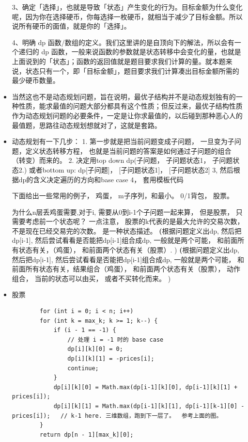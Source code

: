 \documentclass[a4paper,11pt,twoside]{book}
\begin{document}
\begin{itemize}
	3、确定「选择」，也就是导致「状态」产生变化的行为。目标金额为什么变化呢，因为你在选择硬币，你每选择一枚硬币，就相当于减少了目标金额。所以说所有硬币的面值，就是你的「选择」。
	
	4、明确 dp 函数/数组的定义。我们这里讲的是自顶向下的解法，所以会有一个递归的 dp 函数，一般来说函数的参数就是状态转移中会变化的量，也就是上面说到的「状态」；函数的返回值就是题目要求我们计算的量。就本题来说，状态只有一个，即「目标金额」，题目要求我们计算凑出目标金额所需的最少硬币数量。
	
	
	\item 当然这也不是动态规划问题，旨在说明，最优子结构并不是动态规划独有的一种性质，能求最值的问题大部分都具有这个性质；但反过来，最优子结构性质作为动态规划问题的必要条件，一定是让你求最值的，以后碰到那种恶心人的最值题，思路往动态规划想就对了，这就是套路。
	
	\item 动态规划有一下几步：
	1. 第一步就是把当前问题变成子问题， 一旦变为子问题，定义状态转移方程， 也就是当前问题的答案是如何通过子问题的组合（转变）而来的。  
	2. 决定用top down dp(子问题， 子问题状态1， 子问题状态2.)  或者bottom up: dp[子问题]， [子问题状态1]， [子问题状态2] 
	3, 然后根据dp的含义决定遍历的方向和base case
	4， 套用模板代码
	
	下面给出一些常用的例子， 鸡蛋， m子序列，和最小。 0/1背包， 股票。 
	
	为什么n层丢鸡蛋需要,对于i, 需要从0到i-1个子问题一起来算， 但是股票， 只需要考虑前一个状态呢？ 一点注意， 股票的k代表的是最大允许的交易次数，不是现在已经交易完的次数。 是一种状态描述。 
	\textbf(根据问题定义出dp, 然后把dp[i-1], 然后尝试看看是否能把dp[i-1]组合成dp, 一般就是两个可能， 和前面所有状态有关，（鸡蛋）， 和前面两个状态有关（股票）. ) 
	\textbf(根据问题定义出dp, 然后把dp[i-1], 然后尝试看看是否能把dp[i-1]组合成dp, 一般就是两个可能， 和前面所有状态有关，结果组合（鸡蛋）， 和前面两个状态有关（股票）， 动作组合， 当前的状态可以由买， 或者不买转化而来。  ) 
	
	
	


	\item 股票
	\begin{lstlisting}
		for (int i = 0; i < n; i++) 
		for (int k = max_k; k >= 1; k--) {
			if (i - 1 == -1) {
				// 处理 i = -1 时的 base case
				dp[i][k][0] = 0;
				dp[i][k][1] = -prices[i];
				continue;
			}
			dp[i][k][0] = Math.max(dp[i-1][k][0], dp[i-1][k][1] + prices[i]);
			dp[i][k][1] = Math.max(dp[i-1][k][1], dp[i-1][k-1][0] - prices[i]);   // k-1 here. 三维数组，跑到下一层了。  参考上面的图。
		}
		return dp[n - 1][max_k][0];
	\end{lstlisting}


\end{itemize}
\end{document}
